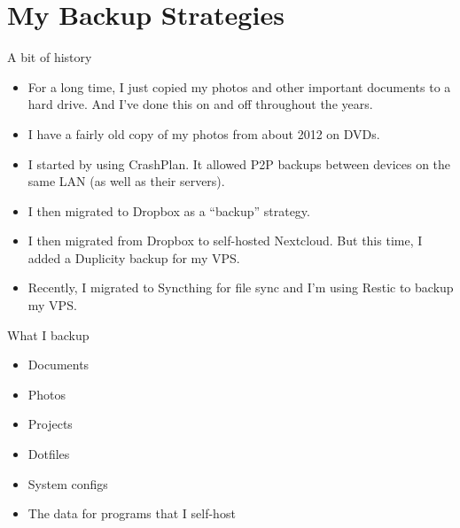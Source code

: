\documentclass{lug}
\begin{document}
\section{My Backup Strategies}

\begin{frame}{A bit of history}

    \begin{itemize}[<+->]
        \item For a long time, I just copied my photos and other important
            documents to a hard drive. And I've done this on and off throughout
            the years.
        \item I have a fairly old copy of my photos from about 2012 on DVDs.
        \item I started by using CrashPlan. It allowed P2P backups between
            devices on the same LAN (as well as their servers).
        \item I then migrated to Dropbox as a ``backup'' strategy.
        \item I then migrated from Dropbox to self-hosted Nextcloud. But this
            time, I added a Duplicity backup for my VPS.
        \item Recently, I migrated to Syncthing for file sync and I'm using
            Restic to backup my VPS.
    \end{itemize}

\end{frame}

\begin{frame}{What I backup}

    \begin{itemize}
        \item Documents
        \item Photos
        \item Projects
        \item Dotfiles
        \item System configs
        \item The data for programs that I self-host
    \end{itemize}

\end{frame}
\end{document}
